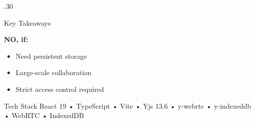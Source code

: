 \documentclass[final,t]{beamer}
\begin{document}
\begin{frame}[t]
\begin{columns}[t]
\begin{column}{.30\linewidth}
\begin{block}{Key Takeaways}
\vspace{0.3cm}
\colorbox{warning!30}{
\parbox{0.95\linewidth}{
\textbf{NO, if:}
\begin{itemize}
    \item Need persistent storage
    \item Large-scale collaboration
    \item Strict access control required
\end{itemize}
}
}
\end{block}

\vspace{0.5cm}

\begin{block}{Tech Stack}
React 19 • TypeScript • Vite • Yjs 13.6 • y-webrtc • y-indexeddb • WebRTC • IndexedDB
\end{block}

\end{column}

\end{columns}
\end{frame}
\end{document}
